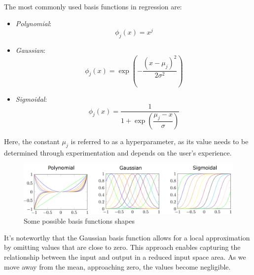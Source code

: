 The most commonly used basis functions in regression are:
\begin{itemize}
    \item \textit{Polynomial}: 
        \[\phi_j(x)=x^j\]
    \item \textit{Gaussian}:
        \[\phi_j(x)=\exp \left( -\dfrac{\left( x-\mu_j \right)^2}{2 \sigma^2} \right) \]
    \item \textit{Sigmoidal}: 
        \[\phi_j(x)=\dfrac{1}{1+\exp\left(\dfrac{\mu_j-x}{\sigma}\right)}\]
\end{itemize}
Here, the constant $\mu_j$ is referred to as a hyperparameter, as its value needs to be determined through experimentation and depends on the user's experience.

\begin{figure}[H]
    \centering
    \includegraphics[width=0.75\linewidth]{images/basis.png}
    \caption{Some possible basis functions shapes}
\end{figure}

It's noteworthy that the Gaussian basis function allows for a local approximation by omitting values that are close to zero.
This approach enables capturing the relationship between the input and output in a reduced input space area.
As we move away from the mean, approaching zero, the values become negligible.

